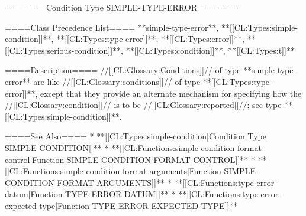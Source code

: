 ====== Condition Type SIMPLE-TYPE-ERROR ======

====Class Precedence List====
**simple-type-error**, **[[CL:Types:simple-condition]]**, **[[CL:Types:type-error]]**, **[[CL:Types:error]]**, **[[CL:Types:serious-condition]]**, **[[CL:Types:condition]]**, **[[CL:Types:t]]**

====Description====
//[[CL:Glossary:Conditions]]// of type **simple-type-error** are like //[[CL:Glossary:conditions]]// of type **[[CL:Types:type-error]]**, except that they provide an alternate mechanism for specifying how the //[[CL:Glossary:condition]]// is to be //[[CL:Glossary:reported]]//; see type **[[CL:Types:simple-condition]]**.

====See Also====
  * **[[CL:Types:simple-condition|Condition Type SIMPLE-CONDITION]]**
  * **[[CL:Functions:simple-condition-format-control|Function SIMPLE-CONDITION-FORMAT-CONTROL]]**
  * **[[CL:Functions:simple-condition-format-arguments|Function SIMPLE-CONDITION-FORMAT-ARGUMENTS]]**
  * **[[CL:Functions:type-error-datum|Function TYPE-ERROR-DATUM]]**
  * **[[CL:Functions:type-error-expected-type|Function TYPE-ERROR-EXPECTED-TYPE]]**

 
